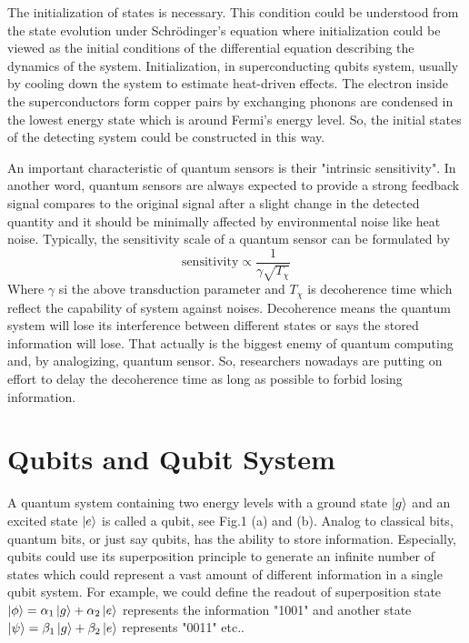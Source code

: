 \documentclass[11pt]{article}
\begin{document}
The initialization of states is necessary. This condition could be understood from the state evolution under Schrödinger's equation where initialization could be viewed as the initial conditions of the differential equation describing the dynamics of the system. Initialization, in superconducting qubits system, usually by cooling down the system to estimate heat-driven effects. The electron inside the superconductors form copper pairs by exchanging phonons are condensed in the lowest energy state which is around Fermi's energy level. So, the initial states of the detecting system could be constructed in this way.

An important characteristic of quantum sensors is their "intrinsic sensitivity"\cite{degen2017quantum}. In another word, quantum sensors are always expected to provide a strong feedback signal compares to the original signal after a slight change in the detected quantity and it should be minimally affected by environmental noise like heat noise. Typically, the sensitivity scale of a quantum sensor can be formulated by\cite{degen2017quantum}
\begin{equation}
	\text{sensitivity} \propto \frac{1}{\gamma\sqrt{T_\chi}}
\end{equation} 
Where $\gamma$ si the above transduction parameter and $T_\chi$ is decoherence time which reflect the capability of system against noises. Decoherence means the quantum system will lose its interference between different states or says the stored information will lose. That actually is the biggest enemy of quantum computing and, by analogizing, quantum sensor. So, researchers nowadays are putting on effort to delay the decoherence time as long as possible to forbid losing information. 

\section{Qubits and Qubit System}
A quantum system containing two energy levels with a ground state $\ket{g}$ and an excited state $\ket{e}$ is called a qubit, see Fig.1 (a) and (b). Analog to classical bits, quantum bits, or just say qubits, has the ability to store information. Especially, qubits could use its superposition principle to generate an infinite number of states which could represent a vast amount of different information in a single qubit system. For example, we could define the readout of superposition state $\ket{\phi} = \alpha_1\ket{g} + \alpha_2\ket{e}$ represents the information "1001" and another state$\ket{\psi} = \beta_1\ket{g} + \beta_2\ket{e}$ represents "0011" etc..  
\end{document}
